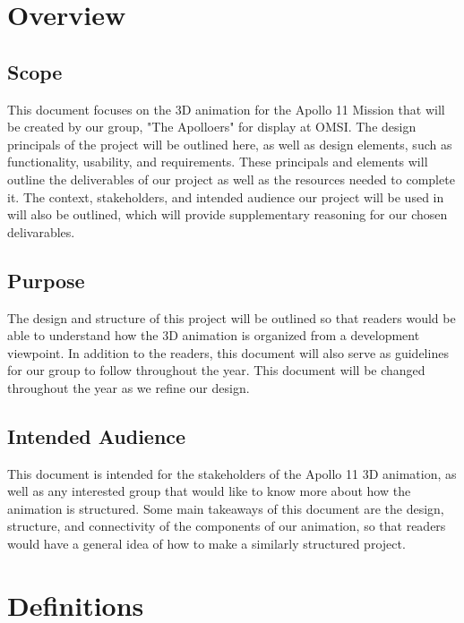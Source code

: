 \documentclass[onecolumn, draftclsnofoot,10pt, compsoc]{IEEEtran}
\begin{document}
\clearpage


\section{Overview}
       \subsection{Scope}
        This document focuses on the 3D animation for the Apollo 11 Mission that will be created by our group, "The Apolloers" for display at OMSI. The design principals of the project will be outlined here, as well as design elements, such as functionality, usability, and requirements. These principals and elements will outline the deliverables of our project as well as the resources needed to complete it. The context, stakeholders, and intended audience our project will be used in will also be outlined, which will provide supplementary reasoning for our chosen delivarables. 
        
    \subsection{Purpose}
        The design and structure of this project will be outlined so that readers would be able to understand how the 3D animation is organized from a development viewpoint. In addition to the readers, this document will also serve as guidelines for our group to follow throughout the year. This document will be changed throughout the year as we refine our design. 

    \subsection{Intended Audience}
        This document is intended for the stakeholders of the Apollo 11 3D animation, as well as any interested group that would like to know more about how the animation is structured. Some main takeaways of this document are the design, structure, and connectivity of the components of our animation, so that readers would have a general idea of how to make a similarly structured project. 

\section{Definitions}
\end{document}
